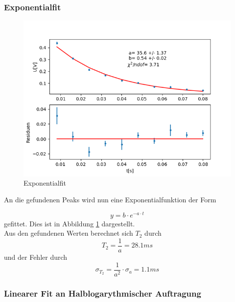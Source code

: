 \documentclass[12pt,a4paper]{article}
\begin{document}
\subsubsection{Exponentialfit}

\begin{figure}
\centering
\includegraphics[scale=0.9]{Bilder/T2exp.png}
\caption{Exponentialfit}
\label{fig:T2exp}
\end{figure}

An die gefundenen Peaks wird nun eine Exponentialfunktion der Form

\begin{equation}
y = b \cdot e^{-a\cdot t}
\end{equation}
gefittet. Dies ist in Abbildung \ref{fig:T2exp} dargestellt.\\
Aus den gefundenen Werten berechnet sich $T_2$ durch 
\begin{equation*}
T_2 = \dfrac{1}{a} = 28.1ms
\end{equation*}
und der Fehler durch
\begin{equation*}
\sigma_{T_2} = \dfrac{1}{a^2} \cdot \sigma_a = 1.1ms
\end{equation*}

\subsubsection{Linearer Fit an Halblogarythmischer Auftragung}
\end{document}
